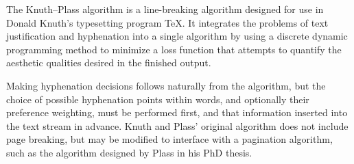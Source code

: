 \documentclass[a4paper, serif, 12pt]{article}
\begin{document}
\setlength{\parskip}{1em}

\noindent
The Knuth–Plass algorithm is a line-breaking algorithm designed for use in
Donald Knuth's typesetting program TeX. It integrates the problems of text
justification and hyphenation into a single algorithm by using a discrete
dynamic programming method to minimize a loss function that attempts to
quantify the aesthetic qualities desired in the finished output.

\noindent
Making hyphenation decisions follows naturally from the algorithm, but the
choice of possible hyphenation points within words, and optionally their
preference weighting, must be performed first, and that information inserted
into the text stream in advance. Knuth and Plass' original algorithm does not
include page breaking, but may be modified to interface with a pagination
algorithm, such as the algorithm designed by Plass in his PhD thesis.
\end{document}
